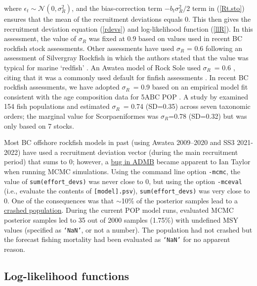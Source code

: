 \documentclass[11pt]{book}
\newcommand{\Norm}{\mathcal{N}}%
\newcommand{\pc}{\%}
\newcommand{\code}[1]{\normalsize\texttt{#1}\normalsize}%
\newcommand{\eref}[1]{(\ref{#1})}
\begin{document}
where $\epsilon_t \sim \Norm(0, \sigma_R^2)$, and the bias-correction term $-b_t \sigma_R^2/2$ term in \eref{Rt.sto} ensures that the mean of the recruitment deviations equals 0. 
This then gives the recruitment deviation equation (\ref{rdevs}) and log-likelihood function (\ref{llR}). 
In this assessment, the value of $\sigma_R$ was fixed at 0.9 based on values used in recent BC rockfish stock assessments.
Other assessments have used $\sigma_R$ = 0.6 following an assessment of Silvergray Rockfish \citep{Starr-etal:2016_sgr} in which the authors stated that the value was typical for marine `redfish' \citep{Mertz-Myers:1996}.
An Awatea model of Rock Sole used $\sigma_R$~= 0.6 \citep{Holt-etal:2016_rol}, citing that it was a commonly used default for finfish assessments \citep{Beddington-Cooke:1983}.
In recent BC rockfish assessments, we have adopted $\sigma_R$~= 0.9 based on an empirical model fit consistent with the age composition data for 5ABC POP \citep{Edwards-etal:2012_pop5ABC}.
A study by \citet{Thorson-etal:2014} examined 154 fish populations and estimated $\sigma_R$~= 0.74 (SD=0.35) across seven taxonomic orders; the marginal value for Scorpaeniformes was $\sigma_R$=0.78 (SD=0.32) but was only based on 7 stocks.

Most BC offshore rockfish models in past (using Awatea 2009--2020 and SS3 2021-2022) have used a recruitment deviation vector (during the main recruitment period) that sums to 0; however, a \href{https://github.com/admb-project/admb/issues/107}{bug in ADMB} became apparent to Ian Taylor when running MCMC simulations. Using the command line option \code{-mcmc}, the value of \code{sum(effort\_devs)} was never close to 0, but using the option \code{-mceval} (i.e., evaluate the contents of \code{[model].psv}), \code{sum(effort\_devs)} was very close to 0.
One of the consequences was that $\sim$10\pc{} of the posterior samples lead to a \href{https://groups.google.com/a/admb-project.org/g/developers/c/8QNAd3a_iGQ}{crashed population}.
During the current POP model runs, evaluated MCMC posterior samples led to 35 out of 2000 samples (1.75\pc{}) with undefined MSY values (specified as \code{`NaN'}, or not a number).
The population had not crashed but the forecast fishing mortality had been evaluated as \code{`NaN'} for no apparent reason.

\subsection{Log-likelihood functions}
\end{document}

